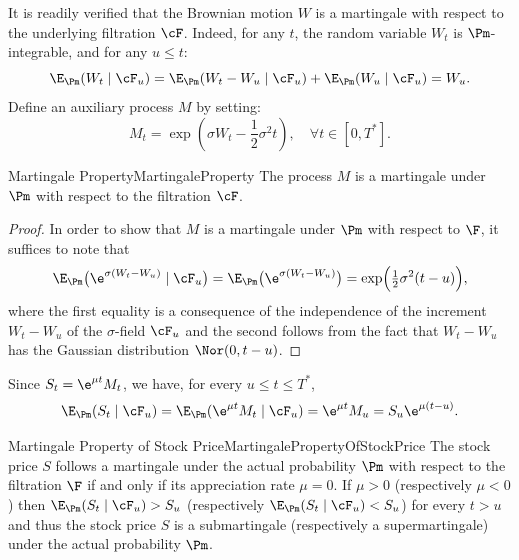 It is readily verified that the Brownian motion $W$ is a martingale with respect to the underlying filtration $\cF$. Indeed, for any $t$, the random variable $W_t$ is $\Pm$-integrable, and for any $u \le t$:
\begin{equation} \label{eq:BrownianMartingaleProperty}
	\E_{\Pm}(W_t \mid \cF_u) = \E_{\Pm}(W_t - W_u \mid \cF_u) + \E_{\Pm}(W_u \mid \cF_u) = W_u.
\end{equation}
Define an auxiliary process \(M\) by setting:
\begin{equation} \label{eq:AuxiliaryProcessM}
	M_t = \exp \left(\sigma W_t - \frac{1}{2}\sigma^2 t\right), \quad \forall t \in [0, T^*].
\end{equation}

\begin{lem}{Martingale Property}{MartingaleProperty}
	The process $M$ is a martingale under $\Pm$ with respect to the filtration $\cF$.
\end{lem}

\begin{proof}
	In order to show that $M$ is a martingale under $\Pm$ with respect to $\F$, it suffices to note that
	\begin{equation} \label{eq:MartingaleCheck}
		\E_{\Pm} \bigl( \e^{\sigma (W_t - W_u)} \mid \cF_u \bigr) = \E_{\Pm} \bigl( \e^{\sigma (W_t - W_u)} \bigr) = \exp \Bigl( \tfrac{1}{2} \sigma^2 (t - u) \Bigr),
	\end{equation}
	where the first equality is a consequence of the independence of the increment $W_t - W_u$ of the $\sigma$-field $\cF_u$ and the second follows from the fact that $W_t - W_u$ has the Gaussian distribution $\Nor(0, t - u)$.
\end{proof}

Since $S_t = \e^{\mu t} M_t$, we have, for every $u \le t \le T^*$,
\begin{equation} \label{eq:StockExpectation}
	\E_{\Pm}(S_t \mid \cF_u) = \E_{\Pm}(\e^{\mu t} M_t \mid \cF_u) = \e^{\mu t} M_u = S_u \e^{\mu(t-u)}.
\end{equation}

\begin{cor}{Martingale Property of Stock Price}{MartingalePropertyOfStockPrice}
	The stock price $S$ follows a martingale under the actual probability $\Pm$ with respect to the filtration $\F$ if and only if its appreciation rate $\mu = 0$. If $\mu > 0$ (respectively $\mu < 0$) then $\E_{\Pm}(S_t \mid \cF_u) > S_u$ (respectively $\E_{\Pm}(S_t \mid \cF_u) < S_u$) for every $t > u$ and thus the stock price $S$ is a submartingale (respectively a supermartingale) under the actual probability $\Pm$.
\end{cor}

